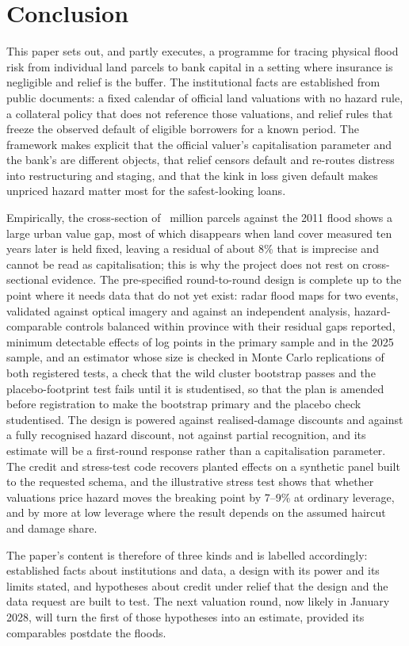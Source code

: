 \section{Conclusion}\label{sec:conclusion}

This paper sets out, and partly executes, a programme for tracing physical flood risk from individual land parcels to bank capital in a setting where insurance is negligible and relief is the buffer. The institutional facts are established from public documents: a fixed calendar of official land valuations with no hazard rule, a collateral policy that does not reference those valuations, and relief rules that freeze the observed default of eligible borrowers for a known period. The framework makes explicit that the official valuer's capitalisation parameter and the bank's are different objects, that relief censors default and re-routes distress into restructuring and staging, and that the kink in loss given default makes unpriced hazard matter most for the safest-looking loans.

Empirically, the cross-section of \pilotParcelsM~million parcels against the 2011 flood shows a large urban value gap, most of which disappears when land cover measured ten years later is held fixed, leaving a residual of about 8\% that is imprecise and cannot be read as capitalisation; this is why the project does not rest on cross-sectional evidence. The pre-specified round-to-round design is complete up to the point where it needs data that do not yet exist: radar flood maps for two events, validated against optical imagery and against an independent analysis, hazard-comparable controls balanced within province with their residual gaps reported, minimum detectable effects of \regMdePooled{} log points in the primary sample and \evMdeW{} in the 2025 sample, and an estimator whose size is checked in \mcxReps{} Monte Carlo replications of both registered tests, a check that the wild cluster bootstrap passes and the placebo-footprint test fails until it is studentised, so that the plan is amended before registration to make the bootstrap primary and the placebo check studentised. The design is powered against realised-damage discounts and against a fully recognised hazard discount, not against partial recognition, and its estimate will be a first-round response rather than a capitalisation parameter. The credit and stress-test code recovers planted effects on a synthetic panel built to the requested schema, and the illustrative stress test shows that whether valuations price hazard moves the breaking point by 7--9\% at ordinary leverage, and by more at low leverage where the result depends on the assumed haircut and damage share.

The paper's content is therefore of three kinds and is labelled accordingly: established facts about institutions and data, a design with its power and its limits stated, and hypotheses about credit under relief that the design and the data request are built to test. The next valuation round, now likely in January 2028, will turn the first of those hypotheses into an estimate, provided its comparables postdate the floods.
